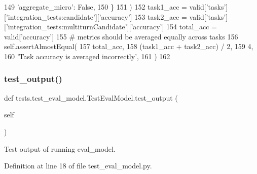 \begin{DoxyCode}
149                 \textcolor{stringliteral}{'aggregate\_micro'}: \textcolor{keyword}{False},
150             \}
151         )
152         task1\_acc = valid[\textcolor{stringliteral}{'tasks'}][\textcolor{stringliteral}{'integration\_tests:candidate'}][\textcolor{stringliteral}{'accuracy'}]
153         task2\_acc = valid[\textcolor{stringliteral}{'tasks'}][\textcolor{stringliteral}{'integration\_tests:multiturnCandidate'}][\textcolor{stringliteral}{'accuracy'}]
154         total\_acc = valid[\textcolor{stringliteral}{'accuracy'}]
155         \textcolor{comment}{# metrics should be averaged equally across tasks}
156         self.assertAlmostEqual(
157             total\_acc,
158             (task1\_acc + task2\_acc) / 2,
159             4,
160             \textcolor{stringliteral}{'Task accuracy is averaged incorrectly'},
161         )
162 
\end{DoxyCode}
\mbox{\label{classtests_1_1test__eval__model_1_1TestEvalModel_a899d6a41fb8f56be62a7145d9937ee52}} 
\subsubsection{\texorpdfstring{test\+\_\+output()}{test\_output()}}
{\footnotesize\ttfamily def tests.\+test\+\_\+eval\+\_\+model.\+Test\+Eval\+Model.\+test\+\_\+output (\begin{DoxyParamCaption}\item[{}]{self }\end{DoxyParamCaption})}

\begin{DoxyVerb}Test output of running eval_model.
\end{DoxyVerb}
 

Definition at line 18 of file test\+\_\+eval\+\_\+model.\+py.


